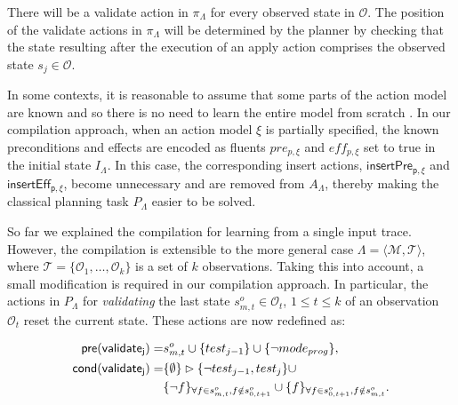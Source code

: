 \documentclass[runningheads]{llncs}
\newcommand{\tup}[1]{{\langle #1 \rangle}}
\newcommand{\pre}{\mathsf{pre}}     %
\newcommand{\cond}{\mathsf{cond}}   %
\begin{document}
\begin{itemize}
\begin{enumerate}
There will be a validate action in $\pi_\Lambda$ for every observed state in $\mathcal{O}$. The position of the validate actions in $\pi_\Lambda$ will be determined by the planner by checking that the state resulting after the execution of an apply action comprises the observed state $s_j\in\mathcal{O}$.

\end{enumerate}
\end{itemize}


In some contexts, it is reasonable to assume that some parts of the action model are known and so there is no need to learn the entire model from scratch \cite{ZhuoNK13}. In our compilation approach, when an action model $\xi$ is partially specified, the known preconditions and effects are encoded as fluents $pre_{p,\xi}$ and $eff_{p,\xi}$ set to true in the initial state $I_{\Lambda}$. In this case, the corresponding insert actions, $\mathsf{insertPre_{p,\xi}}$ and $\mathsf{insertEff_{p,\xi}}$, become unnecessary and are removed from $A_{\Lambda}$, thereby making the classical planning task $P_{\Lambda}$ easier to be solved.

So far we explained the compilation for learning from a single input trace. However, the compilation is extensible to the more general case $\Lambda=\tup{\mathcal{M},\mathcal{T}}$, where $\mathcal{T}=\{\mathcal{O}_1,\ldots,\mathcal{O}_k\}$ is a set of $k$ observations. Taking this into account, a small modification is required in our compilation approach. In particular, the actions in $P_{\Lambda}$ for {\em validating} the last state $s_{m,t}^o\in \mathcal{O}_t$, {\tt\small $1\leq t\leq k$} of an observation $\mathcal{O}_t$ reset the current state. These actions are now redefined as:


\begin{small}
	\begin{align*}
	\hspace*{7pt}\pre(\mathsf{validate_{j}})=&s_{m,t}^o\cup\{test_{j-1}\}\cup \{\neg mode_{prog}\},\\
	\cond(\mathsf{validate_{j}})=&\{\emptyset\}\rhd\{\neg test_{j-1},test_j\} \cup \\
	&\{\neg f\}_{\forall f\in s_{m,t}^o, f \notin s_{0,t+1}^o}\cup \{f\}_{\forall f\in s_{0,t+1}^o, f \notin s_{m,t}^o}.
	\end{align*}
\end{small}
\end{document}
